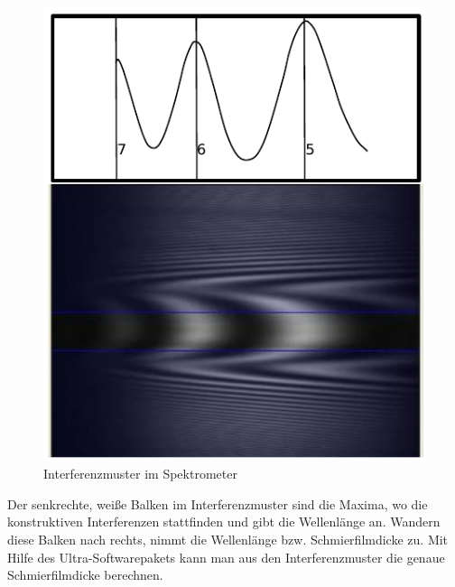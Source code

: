 \begin{figure}[htb]
    \centering
    \includegraphics[]{./images/interferenzsmuster.pdf}
    \caption{Interferenzmuster im Spektrometer~\cite{ehl_broshure}}
    \label{fig:ehl_interferenzmuster}
\end{figure}

Der senkrechte, weiße Balken im Interferenzmuster sind die Maxima, wo die konstruktiven Interferenzen stattfinden und gibt die Wellenlänge an.
Wandern diese Balken nach rechts, nimmt die Wellenlänge bzw. Schmierfilmdicke zu.
Mit Hilfe des Ultra-Softwarepakets kann man aus den Interferenzmuster die genaue Schmierfilmdicke berechnen.

